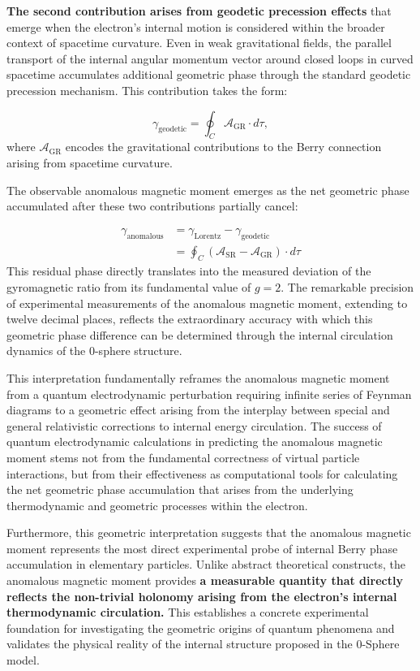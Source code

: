 \documentclass[%
 reprint,
 amsmath,amssymb,
 aps,
]{revtex4-1}
\numberwithin{equation}{section}%
\begin{document}
\textbf{The second contribution arises from geodetic precession effects} that emerge when the electron's internal motion is considered within the broader context of spacetime curvature. Even in weak gravitational fields, the parallel transport of the internal angular momentum vector around closed loops in curved spacetime accumulates additional geometric phase through the standard geodetic precession mechanism. This contribution takes the form:

\begin{equation}
\gamma_{\text{geodetic}} = \oint_C \mathcal{A}_{\text{GR}} \cdot d\tau, \label{eq:geodetic_phase}
\end{equation}
where $\mathcal{A}_{\text{GR}}$ encodes the gravitational contributions to the Berry connection arising from spacetime curvature.

The observable anomalous magnetic moment emerges as the net geometric phase accumulated after these two contributions partially cancel:

\begin{align}
\gamma_{\text{anomalous}} &= \gamma_{\text{Lorentz}} - \gamma_{\text{geodetic}} \nonumber \\
&= \oint_C (\mathcal{A}_{\text{SR}} - \mathcal{A}_{\text{GR}}) \cdot d\tau
\end{align}
This residual phase directly translates into the measured deviation of the gyromagnetic ratio from its fundamental value of $g = 2$. The remarkable precision of experimental measurements of the anomalous magnetic moment, extending to twelve decimal places, reflects the extraordinary accuracy with which this geometric phase difference can be determined through the internal circulation dynamics of the 0-sphere structure.

This interpretation fundamentally reframes the anomalous magnetic moment from a quantum electrodynamic perturbation requiring infinite series of Feynman diagrams to a geometric effect arising from the interplay between special and general relativistic corrections to internal energy circulation. The success of quantum electrodynamic calculations in predicting the anomalous magnetic moment stems not from the fundamental correctness of virtual particle interactions, but from their effectiveness as computational tools for calculating the net geometric phase accumulation that arises from the underlying thermodynamic and geometric processes within the electron.

Furthermore, this geometric interpretation suggests that the anomalous magnetic moment represents the most direct experimental probe of internal Berry phase accumulation in elementary particles. Unlike abstract theoretical constructs, the anomalous magnetic moment provides \textbf{a measurable quantity that directly reflects the non-trivial holonomy arising from the electron's internal thermodynamic circulation.} This establishes a concrete experimental foundation for investigating the geometric origins of quantum phenomena and validates the physical reality of the internal structure proposed in the 0-Sphere model.
\end{document}
